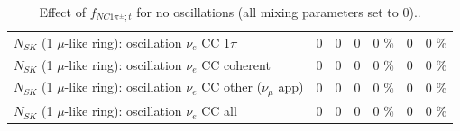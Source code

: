 \begin{table}
\begin{tabular}{| l | r | r | r  r | r  r |}
                     $N_{SK}$ (1 $\mu$-like ring): oscillation $\nu_e$ CC 1$\pi$ &               0 &               0 &               0 &        0 \%  &               0 &        0 \%  \\ 
                   $N_{SK}$ (1 $\mu$-like ring): oscillation $\nu_e$ CC coherent &               0 &               0 &               0 &        0 \%  &               0 &        0 \%  \\ 
      $N_{SK}$ (1 $\mu$-like ring): oscillation $\nu_e$ CC other ($\nu_\mu$ app) &               0 &               0 &               0 &        0 \%  &               0 &        0 \%  \\ 
                       $N_{SK}$ (1 $\mu$-like ring): oscillation $\nu_e$  CC all &               0 &               0 &               0 &        0 \%  &               0 &        0 \%  \\ 
\hline
\hline
\end{tabular}
\caption{ Effect of $f_{NC1\pi^\pm; t}$ for no oscillations (all mixing parameters set to 0).. }
\label{tab:num_xsec_norm_nc1piC_1RmuT_3f_osc_t13:0}
\end{table}
\clearpage
